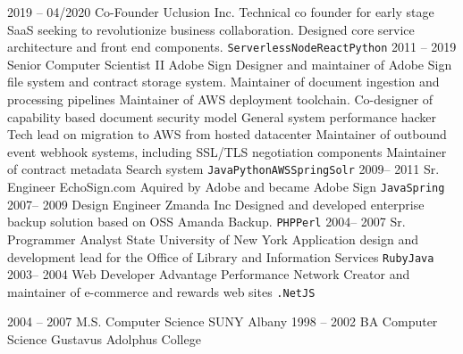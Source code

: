 \documentclass[9pt]{developercv} %
\begin{document}
\begin{entrylist}
	\entry
		{2019 -- 04/2020}
		{Co-Founder}
		{Uclusion Inc.}
	Technical co founder for early stage SaaS seeking to revolutionize business collaboration.
	Designed core service architecture and front end components.
		\texttt{Serverless}\slashsep\texttt{Node}\slashsep\texttt{React}\slashsep\texttt{Python}
	\entry
		{2011 -- 2019}
		{Senior Computer Scientist II}
		{Adobe Sign}
                Designer and maintainer of Adobe Sign file system and contract storage system.
                Maintainer of document ingestion and processing pipelines
                Maintainer of AWS deployment toolchain.
                Co-designer of capability based document security model
                General system performance hacker
                Tech lead on migration to AWS from hosted datacenter
                Maintainer of outbound event webhook systems, including SSL/TLS negotiation components
                Maintainer of contract metadata Search system
		{\texttt{Java}\slashsep\texttt{Python}\slashsep\texttt{AWS}\slashsep\texttt{Spring}\slashsep\texttt{Solr}}
	\entry
		{2009-- 2011}
		{Sr. Engineer}
		{EchoSign.com}
                Aquired by Adobe and became Adobe Sign
		{\texttt{Java}\slashsep\texttt{Spring}}
	\entry
		{2007-- 2009}
		{Design Engineer}
		{Zmanda Inc}
                Designed and developed enterprise backup solution based on OSS Amanda Backup.
		{\texttt{PHP}\slashsep\texttt{Perl}}
	\entry
		{2004-- 2007}
		{Sr. Programmer Analyst}
		{State University of New York}
                Application design and development lead for the Office of Library and Information Services
		{\texttt{Ruby}\slashsep\texttt{Java}}
	\entry
		{2003-- 2004}
		{Web Developer}
		{Advantage Performance Network}
                Creator and maintainer of e-commerce and rewards web sites
		{\texttt{.Net}\slashsep\texttt{JS}}
\end{entrylist}


\begin{entrylist}
	\entry
		{2004 -- 2007}
		{M.S. Computer Science}
	{SUNY Albany}
	\entry
		{1998 -- 2002}
		{BA Computer Science}
	{Gustavus Adolphus College}
\end{entrylist}

\end{document}
